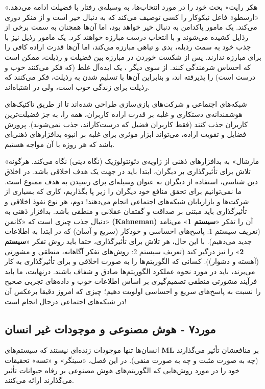 «هکر رایت» بحث خود را در مورد انتخاب‌ها، به وسیله‌ی رفتار با فضیلت ادامه می‌دهد.
«ارسطو» فاعل نیکوکار را کسی توصیف می‌کند که به دنبال خیر است و از منکر دوری می‌کند.
یک مامور پاکدامن به دنبال خیر خواهد بود، اما آن‌ها همچنان به سمت برخی از رذایل کشیده می‌شوند و با انتخاب درست مبارزه خواهند کرد.
یک مامور رذیل نیز با جذب خود به سمت رذیله، بدی و تباهی مبارزه می‌کند، اما آن‌ها قدرت اراده کافی را برای مبارزه ندارند.
پس از شکست خوردن در مبارزه بین فضیلت و رذیلت، ممکن است که احساس شرمندگی کنند.
از سوی دیگر ، یک ایده‌آل غلط (که فکر می‌کنند خوب و درست است) را پذیرفته اند، و بنابراین آن‌ها با تسلیم شدن به رذیلت، فکر می‌کنند که رذیلت برای زندگی خوب است، ولی در اشتباه‌اند.

شبکه‌های اجتماعی و شرکت‌های بازی‌سازی طراحی شده‌اند تا از طریق تاکتیک‌های هوشمندانه‌ی دستکاری و غلبه بر قدرت اراده کاربران، همه را، به جز فضیلت‌ترین کاربران جذب کنند (فقط کاربران فضیل که درست‌کاراند، جذب نمی‌شوند).
پرورش فضایل و تقویت اراده، می‌تواند ابزار موثری برای غلبه بر انبوه بدافزارهای ذهنی‌ای باشد که هر روزه با آن مواجه هستیم.

«مارشال» به بدافزارهای ذهنی از زاویه‌ی دئونتولوژیک (نگاه دینی) نگاه می‌کند.
هرگونه تلاش برای تأثیرگذاری بر دیگران، ابتدا باید در جهت یک هدف اخلاقی باشد.
در اخلاق دین شناسی، استفاده از دیگران به عنوان وسیله‌ای برای رسیدن به هدف ممنوع است.
ما نمی‌توانیم برای تحقق منافع خود دیگران را زیر پا بگذاریم، کاری که بسیاری از شرکت‌ها و بازاریابان شبکه‌های اجتماعی انجام می‌دهند!
دوم، هر نوع نفوذ اخلاقی و تأثیرگذاری باید مبتنی بر صداقت و گفتمان عقلانی و منطقی باشد.
بدافزار ذهنی به دنبال جذب چیزی است که «کانمن» \textenglish{\textbf{(Kahneman)}} آن را تفکر «\textbf{سیستم 1}» می‌نامد (تعریف سیستم 1: پاسخ‌های احساسی و خودکار (سریع و آسان) که در ابتدا به اطلاعات جدید می‌دهیم).
با این حال، هر تلاش برای تأثیرگذاری، حتما باید روش تفکر «\textbf{سیستم 2}» را نیز درگیر کند (تعریف سیستم 2: روش‌های تفکر آگاهانه، منطقی و مشورتی (آهسته و دشوار)).
کسانی که الگوریتم‌ها را به صورت اخلاقی و برای تأثیرگذاری به کار می‌برند، باید در مورد نحوه عملکرد الگوریتم‌ها صادق و شفاف باشند.
درنهایت، ما باید فرآیند مشورتی منطقی تصمیم‌گیری بر اساس اطلاعات خوب و داده‌های تجربی صحیح را نسبت به پاسخ‌های سریع و احساسی اولویت دهیم؛ چیزی که امروز دقیقا برعکس آن در شبکه‌های اجتماعی درحال انجام است!
\newline
\newline


{
\subsection*{مورد۷ - هوش مصنوعی و موجودات غیر انسان}
\label{subsec:مورد۷ - هوش مصنوعی و موجودات غیر انسان}
انسان‌ها تنها موجودات زنده‌ای نیستند که سیستم‌های \textenglish{\textbf{ML}} بر منافعشان تأثیر می‌گذارند (چه به صورت مثبت و چه به صورت منفی).
در این فصل، «سینگر» و «تسه» تحقیقات خود را در مورد روش‌هایی که الگوریتم‌های هوش مصنوعی بر رفاه حیوانات تأثیر می‌گذارند ارائه می‌کنند.
}

